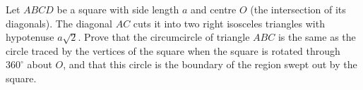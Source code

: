 Let $ABCD$ be a square with side length $a$ and centre $O$ (the intersection of its diagonals). The diagonal $AC$ cuts it into two right isosceles triangles with hypotenuse $a\sqrt2$. Prove that the circumcircle of triangle $ABC$ is the same as the circle traced by the vertices of the square when the square is rotated through $360^\circ$ about $O$, and that this circle is the boundary of the region swept out by the square.
